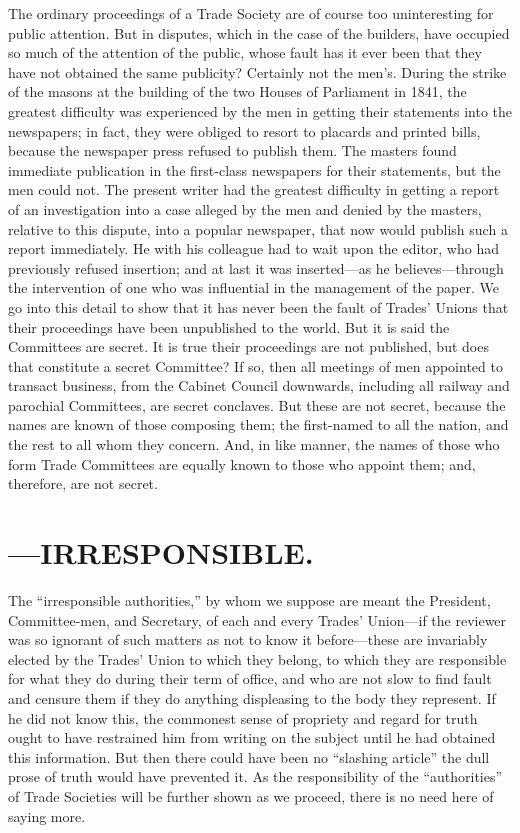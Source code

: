 The ordinary proceedings of a Trade Society are of course too
uninteresting for public attention. But in disputes, which in the case
of the builders, have occupied so much of the attention of the public,
whose fault has it ever been that they have not obtained the same
publicity? Certainly not the men's. During the strike of the masons at
the building of the two Houses of Parliament in 1841, the greatest
difficulty was experienced by the men in getting their statements into
the newspapers; in fact, they were obliged to resort to placards and
printed bills, because the newspaper press refused to publish them. The
masters found immediate publication in the first-class newspapers for
their statements, but the men could not. The present writer had the
greatest difficulty in getting a report of an investigation into a case
alleged by the men and denied by the masters, relative to this dispute,
into a popular newspaper, that now would publish such a report
immediately. He with his colleague had to wait upon the editor, who had
previously refused insertion; and at last it was inserted---as he
believes---through the intervention of one who was influential in the
management of the paper. We go into this detail to show that it has
never been the fault of Trades' Unions that their proceedings have been
unpublished to the world. But it is said the Committees are secret. It
is true their proceedings are not published, but does that constitute a
secret Committee? If so, then all meetings of men appointed to transact
business, from the Cabinet Council downwards, including all railway and
parochial Committees, are secret conclaves. But these are not secret,
because the names are known of those composing them; the first-named to
all the nation, and the rest to all whom they concern. And, in like
manner, the names of those who form Trade Committees are equally known
to those who appoint them; and, therefore, are not secret.

\section{---IRRESPONSIBLE.}

The ``irresponsible authorities,'' by whom we suppose are meant the
President, Committee-men, and Secretary, of each and every Trades'
Union---if the reviewer was so ignorant of such matters as not to know
it before---these are invariably elected by the Trades' Union to which
they belong, to which they are responsible for what they do during their
term of office, and who are not slow to find fault and censure them if
they do anything displeasing to the body they represent. If he did not
know this, the commonest sense of propriety and regard for truth ought
to have restrained him from writing on the subject until he had obtained
this information. But then there could have been no ``slashing article''
the dull prose of truth would have prevented it. As the responsibility
of the ``authorities'' of Trade Societies will be further shown as we
proceed, there is no need here of saying more.


